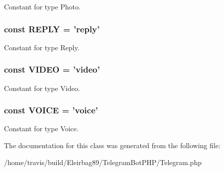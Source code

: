 Constant for type Photo. \hypertarget{class_telegram_acb63774895b195d4c22afe2b089a3ddd}{
\subsubsection[{R\-E\-P\-L\-Y}]{\setlength{\rightskip}{0pt plus 5cm}const R\-E\-P\-L\-Y = 'reply'}}\label{class_telegram_acb63774895b195d4c22afe2b089a3ddd}
Constant for type Reply. \hypertarget{class_telegram_a333a9b0a1034beea1b4b505f30885cea}{
\subsubsection[{V\-I\-D\-E\-O}]{\setlength{\rightskip}{0pt plus 5cm}const V\-I\-D\-E\-O = 'video'}}\label{class_telegram_a333a9b0a1034beea1b4b505f30885cea}
Constant for type Video. \hypertarget{class_telegram_a12e48e3d10ee66d0a6ca34c207d8e282}{
\subsubsection[{V\-O\-I\-C\-E}]{\setlength{\rightskip}{0pt plus 5cm}const V\-O\-I\-C\-E = 'voice'}}\label{class_telegram_a12e48e3d10ee66d0a6ca34c207d8e282}
Constant for type Voice. 

The documentation for this class was generated from the following file\-:\begin{DoxyCompactItemize}
\item 
/home/travis/build/\-Eleirbag89/\-Telegram\-Bot\-P\-H\-P/Telegram.\-php\end{DoxyCompactItemize}
